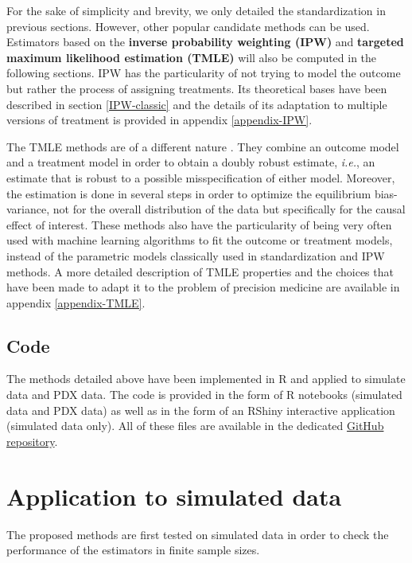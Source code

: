 \documentclass[a4paper,12pt,twoside,onecolumn,openright,final,oldfontcommands]{memoir}
\begin{document}
For the sake of simplicity and brevity, we only detailed the
standardization in previous sections. However, other popular candidate
methods can be used. Estimators based on the \textbf{inverse probability
weighting (IPW)} and \textbf{targeted maximum likelihood estimation
(TMLE)} will also be computed in the following sections. IPW has the
particularity of not trying to model the outcome but rather the process
of assigning treatments. Its theoretical bases have been described in
section \ref{IPW-classic} and the details of its adaptation to multiple
versions of treatment is provided in appendix \ref{appendix-IPW}.

The TMLE methods are of a different nature \citep{van2011targeted}. They
combine an outcome model and a treatment model in order to obtain a
doubly robust estimate, \emph{i.e.}, an estimate that is robust to a
possible misspecification of either model. Moreover, the estimation is
done in several steps in order to optimize the equilibrium
bias-variance, not for the overall distribution of the data but
specifically for the causal effect of interest. These methods also have
the particularity of being very often used with machine learning
algorithms to fit the outcome or treatment models, instead of the
parametric models classically used in standardization and IPW methods. A
more detailed description of TMLE properties and the choices that have
been made to adapt it to the problem of precision medicine are available
in appendix \ref{appendix-TMLE}.

\subsection{Code}\label{code}

The methods detailed above have been implemented in R and applied to
simulate data and PDX data. The code is provided in the form of R
notebooks (simulated data and PDX data) as well as in the form of an
RShiny interactive application (simulated data only). All of these files
are available in the dedicated
\href{https://github.com/JonasBeal/Causal_Precision_Medicine}{GitHub
repository}.

\section{Application to simulated
data}\label{application-to-simulated-data}

The proposed methods are first tested on simulated data in order to
check the performance of the estimators in finite sample sizes.
\end{document}
